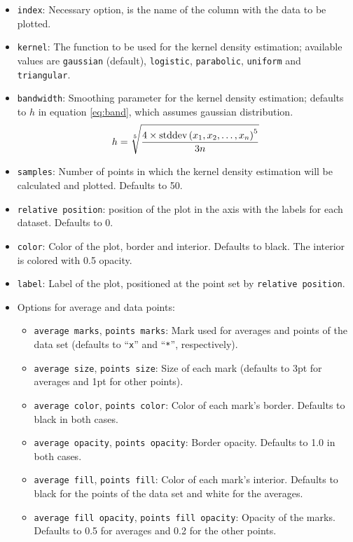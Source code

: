 \documentclass{article}
\begin{document}
\begin{itemize}
	\item \texttt{index}: Necessary option, is the name of the column with
		the data to be plotted.
	\item \texttt{kernel}: The function to be used for the kernel density
		estimation; available values are \texttt{gaussian} (default),
		\texttt{logistic}, \texttt{parabolic}, \texttt{uniform}
		and \texttt{triangular}.
	\item \texttt{bandwidth}: Smoothing parameter for the kernel density
		estimation; defaults to $h$ in equation \ref{eq:band},
		which assumes gaussian distribution.
		\begin{equation}
			\label{eq:band}
			h=\sqrt[5]{\frac{4\times\textnormal{stddev}%
			\left(x_1,x_2,\ldots,x_n\right)^5}{3n}}
		\end{equation}
	\item \texttt{samples}: Number of points in which the kernel density
		estimation will be calculated and plotted. Defaults
		to 50.
	\item \texttt{relative position}: position of the plot in the axis
		with the labels for each dataset. Defaults to 0.
	\item \texttt{color}: Color of the plot, border and interior.
		Defaults to black. The interior is colored with 0.5
		opacity.
	\item \texttt{label}: Label of the plot, positioned at the point
		set by \texttt{relative position}.
	\item Options for average and data points:
	\begin{itemize}
		\item \texttt{average marks}, \texttt{points marks}: Mark used
			for averages and points of the data set (defaults
			to ``\texttt{x}'' and ``\texttt{*}'', respectively).
		\item \texttt{average size}, \texttt{points size}: Size
			of each mark (defaults to 3pt for averages and 1pt
			for other points).
		\item \texttt{average color}, \texttt{points color}: Color
			of each mark's border. Defaults to black in both
			cases.
		\item \texttt{average opacity}, \texttt{points opacity}:
			Border opacity. Defaults to 1.0 in both cases.
		\item \texttt{average fill}, \texttt{points fill}: Color
			of each mark's interior. Defaults to black for the
			points of the data set and white for the averages.
		\item \texttt{average fill opacity}, \texttt{points fill opacity}:
			Opacity of the marks. Defaults to 0.5 for averages and
			0.2 for the other points.
	\end{itemize}
\end{itemize}
\end{document}
